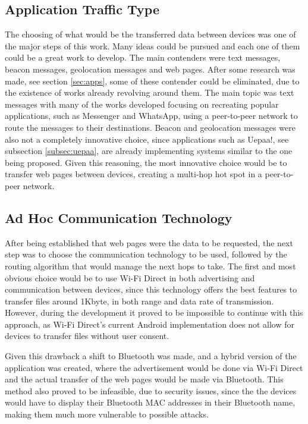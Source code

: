\subsection{Application Traffic Type}

The choosing of what would be the transferred data between devices was one of the major steps of this work. Many ideas could be pursued and each one of them could be a great work to develop. The main contenders were text messages, beacon messages, geolocation messages and web pages. After some research was made, see section \ref{sec:apps}, some of these contender could be eliminated, due to the existence of works already revolving around them. The main topic was text messages with many of the works developed focusing on recreating popular applications, such as Messenger and WhatsApp, using a peer-to-peer network to route the messages to their destinations. Beacon and geolocation messages were also not a completely innovative choice, since applications such as Uepaa!, see subsection \ref{subsec:uepaa}, are already implementing systems similar to the one being proposed. Given this reasoning, the most innovative choice would be to transfer web pages between devices, creating a multi-hop hot spot in a peer-to-peer network.

\subsection{Ad Hoc Communication Technology}

After being established that web pages were the data to be requested, the next step was to choose the communication technology to be used, followed by the routing algorithm that would manage the next hops to take. The first and most obvious choice would be to use Wi-Fi Direct in both advertising and communication between devices, since this technology offers the best features to transfer files around 1Kbyte, in both range and data rate of transmission. However, during the development it proved to be impossible to continue with this approach, as Wi-Fi Direct's current Android implementation does not allow for devices to transfer files without user consent.

Given this drawback a shift to Bluetooth was made, and a hybrid version of the application was created, where the advertisement would be done via Wi-Fi Direct and the actual transfer of the web pages would be made via Bluetooth. This method also proved to be infeasible, due to security issues, since the the devices would have to display their Bluetooth MAC addresses in their Bluetooth name, making them much more vulnerable to possible attacks.

